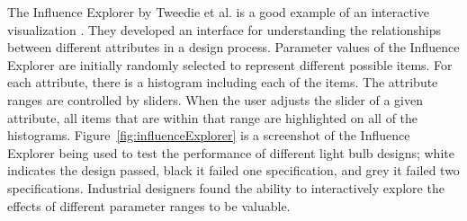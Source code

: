 The Influence Explorer by Tweedie et al. is a good example of an interactive visualization \cite{tweedie1995}.  They developed an interface for understanding the relationships between different attributes in a design process.  Parameter values of the Influence Explorer are initially randomly selected to represent different possible items.  For each attribute, there is a histogram including each of the items.  The attribute ranges are controlled by sliders.  When the user adjusts the slider of a given attribute, all items that are within that range are highlighted on all of the histograms.  Figure~\ref{fig:influenceExplorer} is a screenshot of the Influence Explorer being used to test the performance of different light bulb designs; white indicates the design passed, black it failed one specification, and grey it failed two specifications.  Industrial designers found the ability to interactively explore the effects of different parameter ranges to be valuable.
